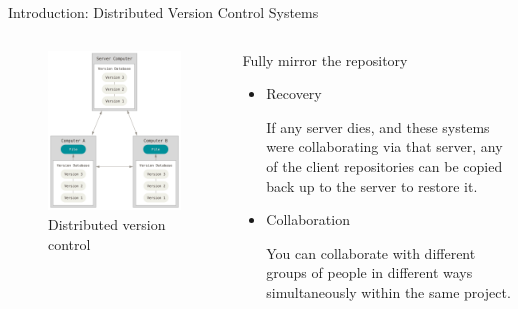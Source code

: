\begin{frame}{Introduction: Distributed Version Control Systems}
  \begin{columns}
    \begin{column}{0.5\textwidth}
      \begin{figure}
        \includegraphics[width=\textwidth]{intro/distributed}
        \caption{Distributed version control}
      \end{figure}
    \end{column}
    \begin{column}{0.5\textwidth}
      Fully mirror the repository
      \footnotesize
      \begin{itemize}
        \item Recovery
        \begin{flushleft}
If any server dies, and these systems were collaborating via that server, any
of the client repositories can be copied back up to the server to restore it.
        \end{flushleft}
        \item Collaboration
        \begin{flushleft}
You can collaborate with different groups of people in different ways
simultaneously within the same project.
        \end{flushleft}
      \end{itemize}
    \end{column}
  \end{columns}
\end{frame}
